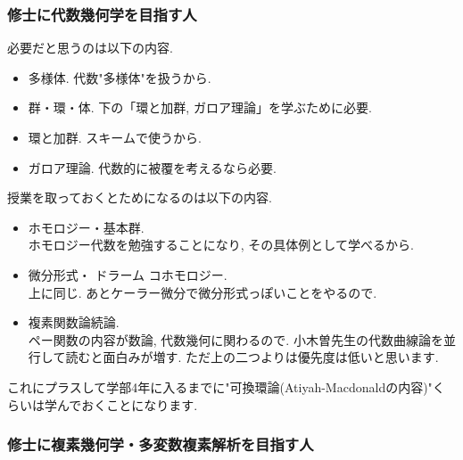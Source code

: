 \subsubsection{修士に代数幾何学を目指す人}
必要だと思うのは以下の内容.
\vspace{-8pt}
\begin{itemize}[left=0pt]
  \setlength{\parskip}{0cm} %
  \setlength{\itemsep}{5pt} %
  \item 多様体. 代数"多様体"を扱うから. 
  \item 群・環・体. 下の「環と加群, ガロア理論」を学ぶために必要.
  \item 環と加群. スキームで使うから. 
  \item ガロア理論. 代数的に被覆を考えるなら必要.
  \end{itemize}
授業を取っておくとためになるのは以下の内容. 
\vspace{-8pt}
\begin{itemize}[left=0pt]
  \setlength{\parskip}{0cm} %
  \setlength{\itemsep}{5pt} %
  \item ホモロジー・基本群. \\ ホモロジー代数を勉強することになり, その具体例として学べるから. 
    \item 微分形式・ ドラーム コホモロジー. \\ 上に同じ. あとケーラー微分で微分形式っぽいことをやるので. 
  \item 複素関数論続論. \\ ペー関数の内容が数論, 代数幾何に関わるので. 小木曽先生の代数曲線論を並行して読むと面白みが増す. ただ上の二つよりは優先度は低いと思います. 
  \end{itemize}
  
これにプラスして学部4年に入るまでに"可換環論(Atiyah-Macdonaldの内容)"くらいは学んでおくことになります. 

\subsubsection{修士に複素幾何学・多変数複素解析を目指す人}

